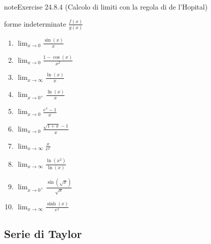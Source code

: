 \documentclass[letterpaper,10pt,italian]{jupyterBook}
\begin{document}
\begin{sphinxadmonition}{note}{Exercise 24.8.4 (Calcolo di limiti con la regola di de l’Hopital)}



\sphinxAtStartPar
forme indeterminate \(\frac{f(x)}{g(x)}\)
\begin{enumerate}
%
\item {} 
\sphinxAtStartPar
\(\lim_{x \to 0} \frac{\sin(x)}{x}\)

\item {} 
\sphinxAtStartPar
\(\lim_{x \to 0} \frac{1 - \cos(x)}{x^2}\)

\item {} 
\sphinxAtStartPar
\(\lim_{x \to \infty} \frac{\ln(x)}{x}\)

\item {} 
\sphinxAtStartPar
\(\lim_{x \to 0^+} \frac{\ln(x)}{x}\)

\item {} 
\sphinxAtStartPar
\(\lim_{x \to 0} \frac{e^x - 1}{x}\)

\item {} 
\sphinxAtStartPar
\(\lim_{x \to 0} \frac{\sqrt{1 + x} - 1}{x}\)

\item {} 
\sphinxAtStartPar
\(\lim_{x \to \infty} \frac{x}{e^x}\)

\item {} 
\sphinxAtStartPar
\(\lim_{x \to \infty} \frac{\ln(x^2)}{\ln(x)}\)

\item {} 
\sphinxAtStartPar
\(\lim_{x \to 0^+} \frac{\sin(\sqrt{x})}{\sqrt{x}}\)

\item {} 
\sphinxAtStartPar
\(\lim_{x \to \infty} \frac{\sinh(x)}{e^x}\)

\end{enumerate}
\end{sphinxadmonition}


\subsection{Serie di Taylor}
\label{\detokenize{ch/infinitesimal_calculus/derivatives-problems:serie-di-taylor}}\label{\detokenize{ch/infinitesimal_calculus/derivatives-problems:infinitesimal-calculus-derivatives-problems-taylor}} \label{exercise:ch/infinitesimal_calculus/derivatives-problems-exercise-4}
\end{document}

